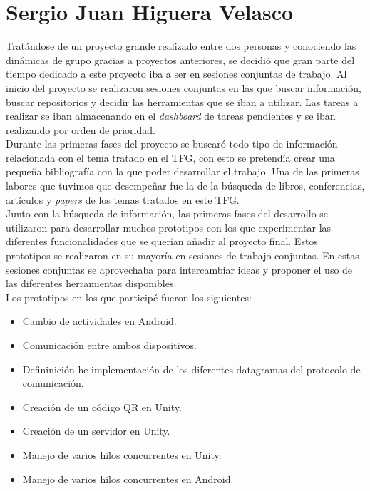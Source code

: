 \section{Sergio Juan Higuera Velasco}

Trat\'andose de un proyecto grande realizado entre dos personas y conociendo las din\'amicas de grupo gracias a proyectos anteriores, se decidi\'o que gran parte del tiempo dedicado a este proyecto iba a ser en sesiones conjuntas de trabajo. Al inicio del proyecto se realizaron sesiones conjuntas en las que buscar informaci\'on, buscar repositorios y decidir las herramientas que se iban a utilizar. Las tareas a realizar se iban almacenando en el \textit{dashboard} de tareas pendientes y se iban realizando por orden de prioridad.\\

Durante las primeras fases del proyecto se buscar\'o todo tipo de informaci\'on relacionada con el tema tratado en el TFG, con esto se pretend\'ia crear una peque\~na bibliograf\'ia con la que poder desarrollar el trabajo. Una de las primeras labores que tuvimos que desempe\~nar fue la de la b\'usqueda de libros, conferencias, art\'iculos y \textit{papers} de los temas tratados en este TFG.\\

Junto con la b\'usqueda de informaci\'on, las primeras fases del desarrollo se utilizaron para desarrollar muchos prototipos con los que experimentar las diferentes funcionalidades que se quer\'ian a\~nadir al proyecto final. Estos prototipos se realizaron en su mayor\'ia en sesiones de trabajo conjuntas. En estas sesiones conjuntas se aprovechaba para intercambiar ideas y proponer el uso de las diferentes herramientas disponibles. \\

Los prototipos en los que particip\'e fueron los siguientes:

\begin{itemize}
  \item  Cambio de actividades en Android.
  \item Comunicaci\'on entre ambos dispositivos.
\item Defininici\'on he implementaci\'on de los diferentes datagramas del protocolo de comunicaci\'on.
\item Creaci\'on de un c\'odigo QR en Unity.
\item Creaci\'on de un servidor en Unity.
\item Manejo de varios hilos concurrentes en Unity.
\item Manejo de varios hilos concurrentes en Android.
\end{itemize}

